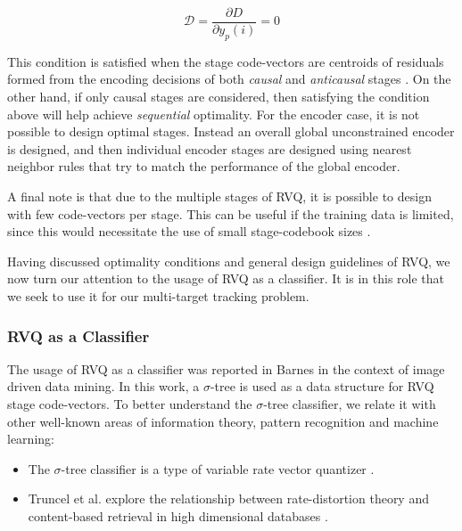 \documentclass[12pt,letterpaper,doublespaced,ETD,proposal]{gt-ece-thesis}
\begin{document}
\begin{Body}
\begin{equation}
\mathcal{D}=\frac{\partial D}{\partial y_p(i)}=0
\end{equation}

This condition is satisfied when the stage code-vectors are centroids of residuals formed from the encoding decisions of both \emph{causal} and \emph{anticausal} stages \cite{1995_JNL_OptimalityRVQ_Kossentini}.  On the other hand, if only causal stages are considered, then satisfying the condition above will help achieve \emph{sequential} optimality.  For the encoder case, it is not possible to design optimal stages.  Instead an overall global unconstrained encoder is designed, and then individual encoder stages are designed using nearest neighbor rules that try to match the performance of the global encoder.

A final note is that due to the multiple stages of RVQ, it is possible to design with few code-vectors per stage.  This can be useful if the training data is limited, since this would necessitate the use of small stage-codebook sizes \cite{1996_JNL_AdvancesRVQ_Barnes}.

Having discussed optimality conditions and general design guidelines of RVQ, we now turn our attention to the usage of RVQ as a classifier.  It is in this role that we seek to use it for our multi-target tracking problem.

\subsubsection{RVQ as a Classifier}
The usage of RVQ as a classifier was reported in Barnes \cite{2007_JNL_IDDM_Barnes} in the context of image driven data mining.  In this work, a $\sigma$-tree is used as a data structure for RVQ stage code-vectors.  To better understand the $\sigma$-tree classifier, we relate it with other well-known areas of information theory,
pattern recognition and machine learning:  

\begin{itemize}
\item The $\sigma$-tree classifier is a type of variable rate vector quantizer \cite{2003_JNL_HighRateVQDetection_Hero}.  

\item Truncel et al. explore the relationship between rate-distortion theory and content-based retrieval in high dimensional databases \cite{2004_JNL_RateDistortionVsDatabases_Truncel}.  


\end{itemize}
\end{Body}
\end{document}
